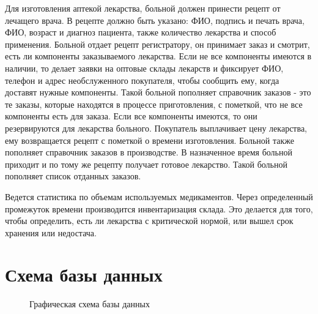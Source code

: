 \documentclass[a4paper]{article}
\begin{document}
			Для изготовления аптекой лекарства, больной должен принести рецепт от лечащего врача. В рецепте должно быть указано: ФИО, подпись и печать врача, ФИО, возраст и диагноз пациента, также количество лекарства и способ применения. Больной отдает рецепт регистратору, он принимает заказ и смотрит, есть ли компоненты заказываемого лекарства. Если не все компоненты имеются в наличии, то делает заявки на оптовые склады лекарств и фиксирует ФИО, телефон и адрес необслуженного покупателя, чтобы сообщить ему, когда доставят нужные компоненты. Такой больной пополняет справочник заказов - это те заказы, которые находятся в процессе приготовления, с пометкой, что не все компоненты есть для заказа. Если все компоненты имеются, то они резервируются для лекарства больного. Покупатель выплачивает цену лекарства, ему возвращается рецепт с пометкой о времени изготовления. Больной также пополняет справочник заказов в производстве. В назначенное время больной приходит и по тому же рецепту получает готовое лекарство. Такой больной пополняет список отданных заказов.
			
			Ведется статистика по объемам используемых медикаментов. Через определенный промежуток времени производится инвентаризация склада. Это делается для того, чтобы определить, есть ли лекарства с критической нормой, или вышел срок хранения или недостача.	
	\section{Схема базы данных}		
		\begin{figure}[H]
			\centering
			\def\svgwidth{\columnwidth}
			
			\caption{\small Графическая схема базы данных}
		\end{figure}
			
\end{document}
